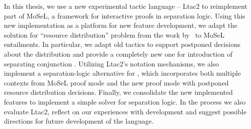 In this thesis, we use a new experimental tactic language -- Ltac2 to reimplement part of MoSeL, a framework for interactive proofs in separation logic.
Using this new implementation as a platform for new feature development, we adapt the solution for ``resource distribution'' problem from the work by~\citet{harlandResourceDistributionBooleanConstraints2003} to MoSeL entailments. In particular, we adapt old tactics to support postponed decisions about the distribution and provide a completely new one for introduction of separating conjunction .
Utilizing Ltac2's notation mechanisms, we also implement a separation-logic alternative for , which incorporates both multiple contexts from MoSeL proof mode and the new proof mode with postponed resource distribution decisions.
Finally, we consolidate the new implemented features to implement a simple solver for separation logic.
In the process we also evaluate Ltac2, reflect on our experiences with development and suggest possible directions for future development of the language.


